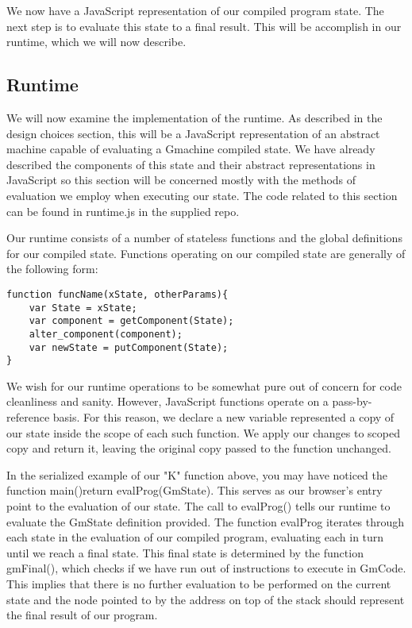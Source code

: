 We now have a JavaScript representation of our compiled program
state. The next step is to evaluate this state to a final 
result. This will be accomplish in our runtime, which we will
now describe.

\subsection{Runtime}
We will now examine the implementation of the runtime. As described
in the design choices section, this will be a JavaScript
representation of an abstract machine capable of evaluating 
a Gmachine compiled state. We have already described the 
components of this state and their abstract representations in
JavaScript so this section will be concerned mostly with the
methods of evaluation we employ when executing our state. The
code related to this section can be found in runtime.js in the
supplied repo. 

Our runtime consists of a number of stateless functions and the 
global definitions for our compiled state. Functions operating
on our compiled state are generally of the following form:

\begin{verbatim}
function funcName(xState, otherParams){
	var State = xState;
	var component = getComponent(State);
	alter_component(component);
	var newState = putComponent(State);
}
\end{verbatim}

\noindent We wish for our runtime operations to be somewhat
pure out of concern for code cleanliness and sanity. However,
JavaScript functions operate on a pass-by-reference basis. 
For this reason, we declare a new variable represented a 
copy of our state inside the scope of each such function.
We apply our changes to scoped copy and return it, leaving
the original copy passed to the function unchanged.

In the serialized example of our "K" function above, you may
have noticed the function main(){return evalProg(GmState)}. 
This serves as our browser's entry point to the evaluation of
our state. The call to evalProg() tells our runtime to evaluate
the GmState definition provided. The function evalProg iterates
through each state in the evaluation of our compiled program,
evaluating each in turn until we reach a final state. This
final state is determined by the function gmFinal(), which 
checks if we have run out of instructions to execute in GmCode.
This implies that there is no further evaluation to be performed
on the current state and the node pointed to by the address on
top of the stack should represent the final result of our 
program. 

